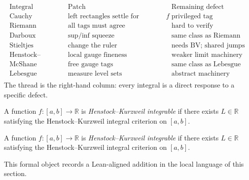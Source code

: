 \begin{remark*}[Interpretation]
\[
\begin{aligned}
\begin{array}{c|c|c}
\text{Integral} & \text{Patch} & \text{Remaining defect}\\
\hline
\text{Cauchy} & \text{left rectangles settle for continuous } f &
\text{privileged tag}\\
\text{Riemann} & \text{all tags must agree} &
\text{hard to verify}\\
\text{Darboux} & \text{sup/inf squeeze} &
\text{same class as Riemann}\\
\text{Stieltjes} & \text{change the ruler} &
\text{needs BV; shared jumps}\\
\text{Henstock--Kurzweil} & \text{local gauge fineness} &
\text{weaker limit machinery}\\
\text{McShane} & \text{free gauge tags} &
\text{same class as Lebesgue}\\
\text{Lebesgue} & \text{measure level sets} &
\text{abstract machinery required}
\end{array}
\end{aligned}
\]
The thread is the right-hand column: every integral is a direct response to a
specific defect.
\end{remark*}

\begin{definition}
\label{def:is-h-k-integrable}
A function $f:[a,b]\to\mathbb R$ is \emph{Henstock--Kurzweil integrable} if there exists $L\in\mathbb R$ satisfying the Henstock--Kurzweil integral criterion on $[a,b]$.
\end{definition}

\begin{remark*}
A function $f:[a,b]\to\mathbb R$ is \emph{Henstock--Kurzweil integrable} if there exists $L\in\mathbb R$ satisfying the Henstock--Kurzweil integral criterion on $[a,b]$.
\end{remark*}

\begin{remark*}[Interpretation]
This formal object records a Lean-aligned addition in the local language of this section.
\end{remark*}

